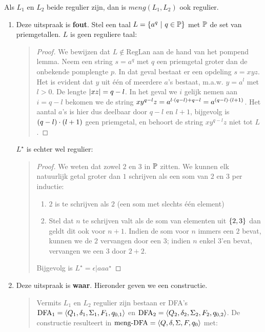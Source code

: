 \documentclass{article}
\begin{document}
\begin{question}
\begin{enumerate}
Als $L_1$ en $L_2$ beide regulier zijn, dan is $meng(L_1,L_2)$ ook regulier.
\end{enumerate}
\begin{answer}
\begin{enumerate}
 \item Deze uitspraak is \textbf{fout}. Stel een taal $L=\left\{ a^q\ |\ q\in\mathbb{P} \right\}$ met $\mathbb{P}$ de set van priemgetallen. $L$ is geen reguliere taal:
 \begin{quote}
 \begin{proof}
 We bewijzen dat $L\notin\mbox{RegLan}$ aan de hand van het pompend lemma. Neem een string $s=a^q$ met $q$ een priemgetal groter dan de onbekende pomplengte $p$. In dat geval bestaat er een opdeling $s=xyz$. Het is evident dat $y$ uit \'e\'en of meerdere $a$'s bestaat, m.a.w. $y=a^l$ met $l>0$. De lengte $\left|xz\right|=q-l$. In het geval we $i$ gelijk nemen aan $i=q-l$ bekomen we de string $xy^{q-l}z=a^{l\cdot\left( q-l \right)+q-l}=a^{\left( q-l \right)\cdot\left( l+1 \right)}$. Het aantal $a$'s is hier dus deelbaar door $q-l$ en $l+1$, bijgevolg is $\left( q-l \right)\cdot\left( l+1 \right)$ geen priemgetal, en behoort de string $xy^{q-l}z$ niet tot $L$.
 \end{proof}
 \end{quote}
 $L^{\star}$ is echter wel regulier:
 \begin{quote}
 \begin{proof}
 We weten dat zowel $2$ en $3$ in $\mathbb{P}$ zitten. We kunnen elk natuurlijk getal groter dan $1$ schrijven als een som van $2$ en $3$ per inductie:
 \begin{enumerate}
  \item $2$ is te schrijven als $2$ (een som met slechts \'e\'en element)
  \item Stel dat $n$ te schrijven valt als de som van elementen uit $\left\{ 2,3 \right\}$ dan geldt dit ook voor $n+1$. Indien de som voor $n$ immers een $2$ bevat, kunnen we de $2$ vervangen door een $3$; indien $n$ enkel $3$'en bevat, vervangen we een $3$ door $2+2$.
 \end{enumerate}
 Bijgevolg is $L^{\star}=\epsilon|aaa^{\star}$
 \end{proof}
 \end{quote}
 \item Deze uitspraak is \textbf{waar}. Hieronder geven we een constructie.
 \begin{quote}
 \begin{construction}
 Vermits $L_1$ en $L_2$ regulier zijn bestaan er DFA's $\mbox{DFA}_1=\left\langle Q_1,\delta_1,\Sigma_1,F_1,q_{0,1} \right\rangle$ en $\mbox{DFA}_2=\left\langle Q_2,\delta_2,\Sigma_2,F_2,q_{0,2} \right\rangle$. De constructie resulteert in $\mbox{meng-DFA}=\left\langle Q,\delta,\Sigma,F,q_0 \right\rangle$ met:

\end{construction}
\end{quote}
\end{enumerate}
\end{answer}
\end{question}
\end{document}
